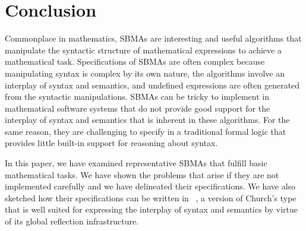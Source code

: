 \documentclass[fleqn]{llncs}
\begin{document}
\iffalse

There are some attempts at specifying CA:
\begin{itemize}
\item a PhD thesis 
\url{https://www3.risc.jku.at/publications/download/risc_4981/main.pdf}
\item (There are talks by Stephen Watt on Computer Algebra vs Symbolic
Computation, but I can't find any published papers). For example
\url{https://cs.uwaterloo.ca/~smwatt/talks/2008-trics-dirty-secret.pdf}
\item Cezary's thesis; I would devote real space to this, as well as doing
both forward and backward searches on it.
\item lightweight formal methods for computer algebra
\url{http://axiom-wiki.newsynthesis.org/public/refs/formal.pdf}
\item Some old work of Dominique Duval, such as
Towards Diagrammatic Specifications of Symbolic Computation Systems.
Maybe there's more on his DBLP page?
\url{https://dblp.uni-trier.de/pers/hd/d/Duval:Dominique}
\end{itemize}

\fi

\section{Conclusion}\label{sec:conclusion}

Commonplace in mathematics, SBMAs are interesting and useful
algorithms that manipulate the syntactic structure of mathematical
expressions to achieve a mathematical task.  Specifications of SBMAs
are often complex because manipulating syntax is complex by its own
nature, the algorithms involve an interplay of syntax and semantics,
and undefined expressions are often generated from the syntactic
manipulations.  SBMAs can be tricky to implement in mathematical
software systems that do not provide good support for the interplay of
syntax and semantics that is inherent in these algorithms.  For the
same reason, they are challenging to specify in a traditional formal
logic that provides little built-in support for reasoning about
syntax.

In this paper, we have examined representative SBMAs that fulfill
basic mathematical tasks.  We have shown the problems that arise if
they are not implemented carefully and we have delineated their
specifications.  We have also sketched how their specifications can be
written in {\churchuqe}~\cite{Farmer17}, a version of Church's type
that is well suited for expressing the interplay of syntax and
semantics by virtue of its global reflection infrastructure.
\end{document}
